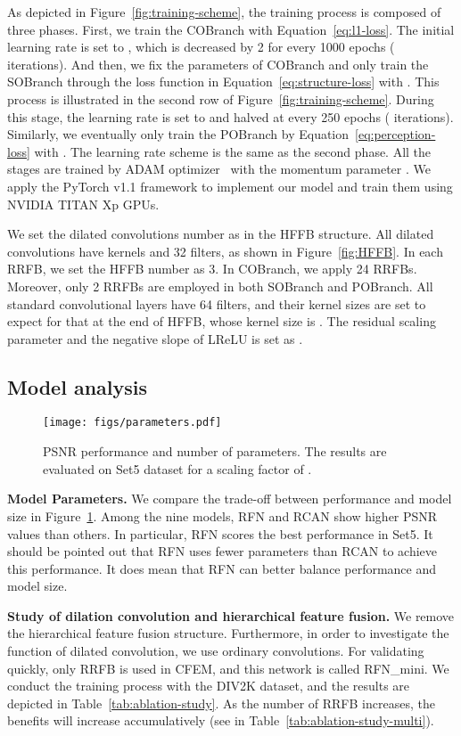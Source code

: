 \documentclass[preprint]{elsarticle}
\begin{document}
As depicted in Figure~\ref{fig:training-scheme}, the training process is composed of three phases. First, we train the COBranch with Equation~\ref{eq:l1-loss}. The initial learning rate is set to , which is decreased by 2 for every 1000 epochs ( iterations). And then, we fix the parameters of COBranch and only train the SOBranch through the loss function in Equation~\ref{eq:structure-loss} with . This process is illustrated in the second row of Figure~\ref{fig:training-scheme}. During this stage, the learning rate is set to  and halved at every 250 epochs ( iterations). Similarly, we eventually only train the POBranch by Equation~\ref{eq:perception-loss} with . The learning rate scheme is the same as the second phase. All the stages are trained by ADAM optimizer~\cite{Adam} with the momentum parameter . We apply the PyTorch v1.1 framework to implement our model and train them using NVIDIA TITAN Xp GPUs.

We set the dilated convolutions number as  in the HFFB structure. All dilated convolutions have  kernels and 32 filters, as shown in Figure~\ref{fig:HFFB}. In each RRFB, we set the HFFB number as 3. In COBranch, we apply 24 RRFBs. Moreover, only 2 RRFBs are employed in both SOBranch and POBranch. All standard convolutional layers have 64 filters, and their kernel sizes are set to  expect for that at the end of HFFB, whose kernel size is .  The residual scaling parameter  and the negative slope of LReLU is set as .

\subsection{Model analysis}
\begin{figure}[htbp]
	\begin{center}
		\texttt{[image: figs/parameters.pdf]}
	\end{center}
	\caption{PSNR performance and number of parameters. The results are evaluated on Set5 dataset for a scaling factor of .}
	\label{fig:parameters}
\end{figure}
\textbf{Model Parameters.} We compare the trade-off between performance and model size in Figure~\ref{fig:parameters}. Among the nine models, RFN and RCAN show higher PSNR values than others. In particular, RFN scores the best performance in Set5. It should be pointed out that RFN uses fewer parameters than RCAN to achieve this performance. It does mean that RFN can better balance performance and model size.


\textbf{Study of dilation convolution and hierarchical feature fusion.} We remove the hierarchical feature fusion structure. Furthermore, in order to investigate the function of dilated convolution, we use ordinary convolutions. For validating quickly, only  RRFB is used in CFEM, and this network is called RFN\_mini. We conduct the training process with the DIV2K dataset, and the results are depicted in Table~\ref{tab:ablation-study}. As the number of RRFB increases, the benefits will increase accumulatively (see in Table~\ref{tab:ablation-study-multi}).
\end{document}
